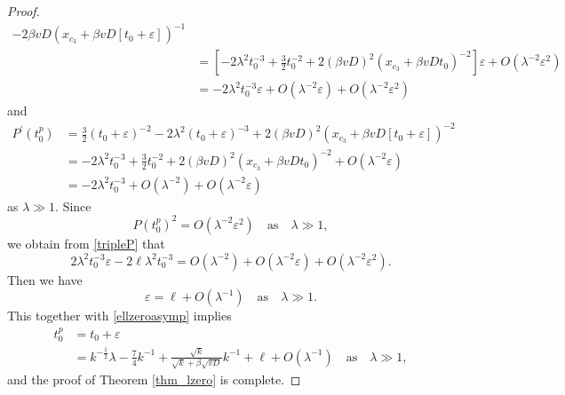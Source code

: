 \documentclass[10pt]{article}
\numberwithin{equation}{section}
\numberwithin{figure}{section}
\begin{document}
\begin{proof}
\begin{equation}
\begin{split}
- 2\beta v D  \left( x_{c_3} + \beta v D [t_0 + \varepsilon]\right)^{-1} \\
 &=\left[ -2 \lambda^2 t_0^{-3} + \frac{3}{2}t_0^{-2} + 2(\beta v D)^2  \left( x_{c_3} + \beta v D t_0 \right)^{-2}\right]\varepsilon +  O\left( \lambda^{-2}\varepsilon^2 \right) \\
  &= -2 \lambda^2 t_0^{-3}\varepsilon + O\left( \lambda^{-2}\varepsilon \right) + O\left( \lambda^{-2}\varepsilon^2 \right)
\end{split}
\end{equation}
and
\begin{equation}\label{P(tp)expan2}
\begin{split}
P^{'}(t^p_0) &= \frac{3}{2} \left(t_0 + \varepsilon\right)^{-2} -2 \lambda^2 \left(t_0 + \varepsilon\right)^{-3} 
+ 2 (\beta v D)^2  \left( x_{c_3} + \beta v D [t_0 + \varepsilon]\right)^{-2} \\
 &=   -2 \lambda^2 t_0^{-3} + \frac{3}{2}t_0^{-2} + 2(\beta v D)^2  \left( x_{c_3} + \beta v D t_0 \right)^{-2} +O\left( \lambda^{-2}\varepsilon \right) \\
 &= -2 \lambda^2 t_0^{-3} +  O\left( \lambda^{-2} \right) + O\left( \lambda^{-2}\varepsilon \right)
\end{split}
\end{equation}
as $\lambda \gg 1$. Since 
$$
P(t^p_0)^2 =  O\left( \lambda^{-2}\varepsilon^2 \right) \quad \mbox{as} \quad \lambda \gg 1,
$$
we obtain from \eqref{tripleP} that
$$
2 \lambda^2 t_0^{-3}\varepsilon   -2 \ell \lambda^2 t_0^{-3} =  O\left( \lambda^{-2} \right) + O\left( \lambda^{-2}\varepsilon \right)+ O\left( \lambda^{-2}\varepsilon^2 \right).
$$
Then we have 
$$
\varepsilon = \ell + O\left( \lambda^{-1} \right)  \quad \mbox{as} \quad \lambda \gg 1.
$$
This together with \eqref{ellzeroasymp} implies
\begin{equation*}
\begin{split}
t^{p}_0 &= t_0 + \varepsilon \\
&=k^{-\frac{1}{2}}\lambda - \frac{7}{4}k^{-1} + \frac{\sqrt{k}}{\sqrt{k}+\beta\sqrt{vD}}k^{-1} + \ell + O\left(\lambda^{-1}\right) \quad \mbox{as} \quad \lambda \gg 1,
\end{split}
\end{equation*}
and the proof of Theorem \ref{thm_lzero} is complete.
\end{proof}
\end{document}
